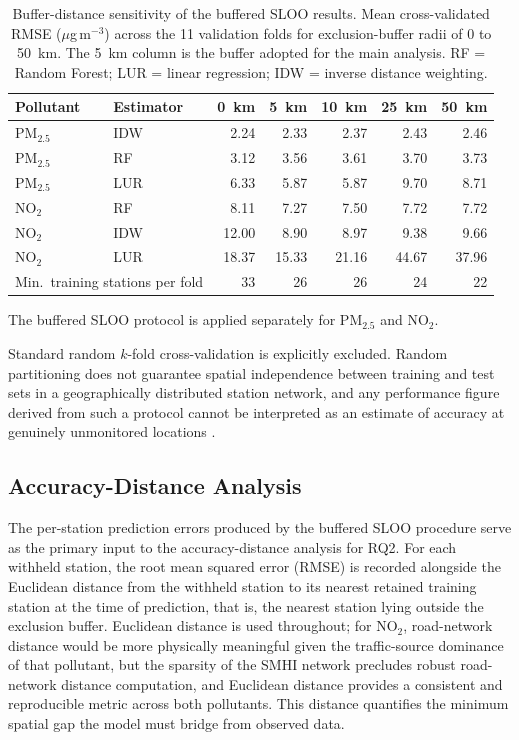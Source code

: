 \documentclass[11pt,a4paper]{article}
\let\oldsubsection\subsection
\renewcommand{\subsection}{\FloatBarrier\oldsubsection}
\begin{document}
\begin{table}[ht]
\caption{Buffer-distance sensitivity of the buffered SLOO results. Mean cross-validated RMSE ($\mu$g\,m$^{-3}$) across the 11 validation folds for exclusion-buffer radii of 0 to 50~km. The 5~km column is the buffer adopted for the main analysis. RF = Random Forest; LUR = linear regression; IDW = inverse distance weighting.}
\label{tab:buffer-sensitivity}
\small
\centering
\begin{tabular}{llrrrrr}
\hline
\textbf{Pollutant} & \textbf{Estimator} & \textbf{0~km} & \textbf{5~km} & \textbf{10~km} & \textbf{25~km} & \textbf{50~km} \\
\hline
PM$_{2.5}$ & IDW & 2.24 & 2.33 & 2.37 & 2.43 & 2.46 \\
PM$_{2.5}$ & RF  & 3.12 & 3.56 & 3.61 & 3.70 & 3.73 \\
PM$_{2.5}$ & LUR & 6.33 & 5.87 & 5.87 & 9.70 & 8.71 \\
NO$_2$     & RF  & 8.11 & 7.27 & 7.50 & 7.72 & 7.72 \\
NO$_2$     & IDW & 12.00 & 8.90 & 8.97 & 9.38 & 9.66 \\
NO$_2$     & LUR & 18.37 & 15.33 & 21.16 & 44.67 & 37.96 \\
\hline
\multicolumn{2}{l}{Min.\ training stations per fold} & 33 & 26 & 26 & 24 & 22 \\
\hline
\end{tabular}
\end{table}

The buffered SLOO protocol is applied separately for PM$_{2.5}$ and NO$_{2}$.

Standard random $k$-fold cross-validation is explicitly excluded. Random partitioning does not guarantee spatial independence between training and test sets in a geographically distributed station network, and any performance figure derived from such a protocol cannot be interpreted as an estimate of accuracy at genuinely unmonitored locations \cite{roberts_spatial_cv_2017}.

\subsection{Accuracy-Distance Analysis}
\label{sec:decay-method}

The per-station prediction errors produced by the buffered SLOO procedure serve as the primary input to the accuracy-distance analysis for RQ2. For each withheld station, the root mean squared error (RMSE) is recorded alongside the Euclidean distance from the withheld station to its nearest retained training station at the time of prediction, that is, the nearest station lying outside the exclusion buffer. Euclidean distance is used throughout; for NO$_2$, road-network distance would be more physically meaningful given the traffic-source dominance of that pollutant, but the sparsity of the SMHI network precludes robust road-network distance computation, and Euclidean distance provides a consistent and reproducible metric across both pollutants. This distance quantifies the minimum spatial gap the model must bridge from observed data.
\end{document}
